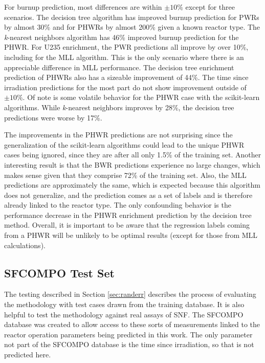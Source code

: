 For burnup prediction, most differences are within $\pm10\%$ except for three
scenarios.  The decision tree algorithm has improved burnup prediction for
\gls{PWR}s by almost 30\% and for \gls{PHWR}s by almost 200\% given a known
reactor type.  The \textit{k}-nearest neighbors algorithm has 46\% improved
burnup prediction for the \gls{PHWR}. For \gls{U235} enrichment, the \gls{PWR}
predictions all improve by over 10\%, including for the \gls{MLL} algorithm.
This is the only scenario where there is an appreciable difference in \gls{MLL}
performance. The decision tree enrichment prediction of \gls{PHWR}s also has a
sizeable improvement of 44\%.  The time since irradiation predictions for the
most part do not show improvement outside of $\pm10\%$. Of note is some
volatile behavior for the \gls{PHWR} case with the scikit-learn algorithms.
While \textit{k}-nearest neighbors improves by 28\%, the decision tree
predictions were worse by 17\%.

The improvements in the \gls{PHWR} predictions are not surprising since the
generalization of the scikit-learn algorithms could lead to the unique
\gls{PHWR} cases being ignored, since they are after all only 1.5\% of the
training set.  Another interesting result is that the \gls{BWR} predictions
experience no large changes, which makes sense given that they comprise 72\% of
the training set. Also, the \gls{MLL} predictions are approximately the same,
which is expected because this algorithm does not generalize, and the
prediction comes as a set of labels and is therefore already linked to the
reactor type.  The only confounding behavior is the performance decrease in the
\gls{PHWR} enrichment prediction by the decision tree method.  Overall, it is
important to be aware that the regression labels coming from a \gls{PHWR} will
be unlikely to be optimal results (except for those from \gls{MLL}
calculations).

\subsection{SFCOMPO Test Set}
\label{sec:sfcompo}

The testing described in Section \ref{sec:randerr} describes the process of
evaluating the methodology with test cases drawn from the training database.
It is also helpful to test the methodology against real assays of \gls{SNF}.
The \gls{SFCOMPO} database was created to allow access to these sorts of
measurements linked to the reactor operation parameters being predicted in this
work. The only parameter not part of the \gls{SFCOMPO} database is the time
since irradiation, so that is not predicted here. 

